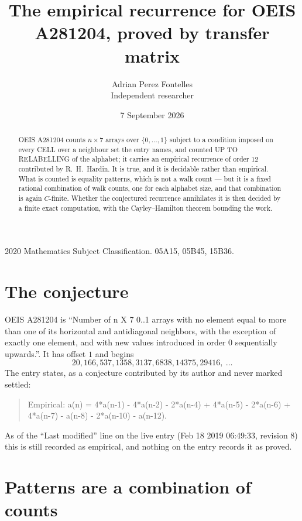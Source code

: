 \documentclass[11pt,a4paper]{article}
\title{The empirical recurrence for OEIS A281204, proved by transfer matrix}
\author{Adrian Perez Fontelles\\ \small Independent researcher}
\date{7 September 2026}
\theoremstyle{plain}
\theoremstyle{definition}
\begin{document}
\maketitle

\begin{abstract}
OEIS A281204 counts $n\times7$ arrays over $\{0,\dots,1\}$ subject to a condition imposed on
every CELL over a neighbour set the entry names, and counted UP TO RELABELLING of the
alphabet; it carries an empirical recurrence of order $12$ contributed by
R.~H.~Hardin. It is true, and it is decidable rather than empirical. What is counted is
equality patterns, which is not a walk count --- but it is a fixed rational combination of
walk counts, one for each alphabet size, and that combination is again $C$-finite. Whether the
conjectured recurrence annihilates it is then decided by a finite exact computation, with the
Cayley--Hamilton theorem bounding the work.
\end{abstract}

\noindent\small 2020 Mathematics Subject Classification. 05A15, 05B45, 15B36.\normalsize

\section{The conjecture}

OEIS A281204 is ``Number of n X 7 0..1 arrays with no element equal to more than one of its horizontal and antidiagonal neighbors, with the exception of exactly one element, and with new values introduced in order 0 sequentially upwards.''. It has offset $1$ and begins
\[
20, 166, 537, 1358, 3137, 6838, 14375, 29416,\ \dots
\]
The entry states, as a conjecture contributed by its author and never marked settled:
\begin{quote}
Empirical: a(n) = 4*a(n-1) - 4*a(n-2) - 2*a(n-4) + 4*a(n-5) - 2*a(n-6) + 4*a(n-7) - a(n-8) - 2*a(n-10) - a(n-12).
\end{quote}
As of the ``Last modified'' line on the live entry (Feb 18 2019 06:49:33, revision 8) this is still
recorded as empirical, and nothing on the entry records it as proved.

\section{Patterns are a combination of counts}
\end{document}
